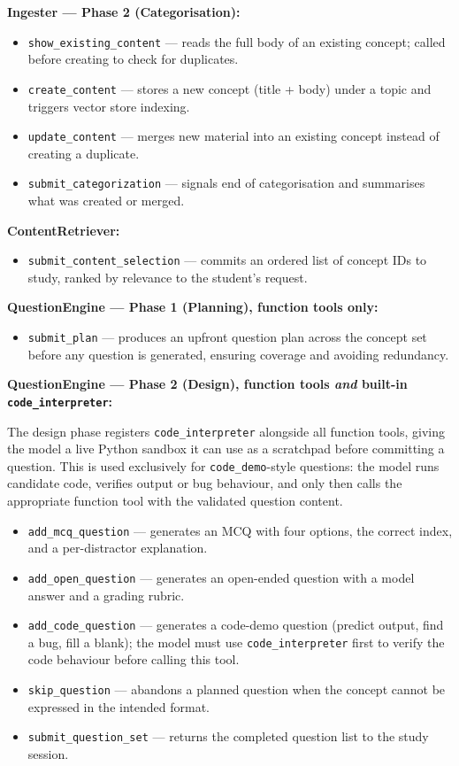 \documentclass[12pt,a4paper]{article}
\begin{document}
\textbf{Ingester --- Phase 2 (Categorisation):}
\begin{itemize}[leftmargin=*, itemsep=2pt]
  \item \texttt{show\_existing\_content} --- reads the full body of an existing concept; called before creating to check for duplicates.
  \item \texttt{create\_content} --- stores a new concept (title + body) under a topic and triggers vector store indexing.
  \item \texttt{update\_content} --- merges new material into an existing concept instead of creating a duplicate.
  \item \texttt{submit\_categorization} --- signals end of categorisation and summarises what was created or merged.
\end{itemize}

\textbf{ContentRetriever:}
\begin{itemize}[leftmargin=*, itemsep=2pt]
  \item \texttt{submit\_content\_selection} --- commits an ordered list of concept IDs to study, ranked by relevance to the student's request.
\end{itemize}

\textbf{QuestionEngine --- Phase 1 (Planning), function tools only:}
\begin{itemize}[leftmargin=*, itemsep=2pt]
  \item \texttt{submit\_plan} --- produces an upfront question plan across the concept set before any question is generated, ensuring coverage and avoiding redundancy.
\end{itemize}

\textbf{QuestionEngine --- Phase 2 (Design), function tools \textit{and} built-in \texttt{code\_interpreter}:}

The design phase registers \texttt{code\_interpreter} alongside all function tools, giving the model a live Python sandbox it can use as a scratchpad before committing a question. This is used exclusively for \texttt{code\_demo}-style questions: the model runs candidate code, verifies output or bug behaviour, and only then calls the appropriate function tool with the validated question content.
\begin{itemize}[leftmargin=*, itemsep=2pt]
  \item \texttt{add\_mcq\_question} --- generates an MCQ with four options, the correct index, and a per-distractor explanation.
  \item \texttt{add\_open\_question} --- generates an open-ended question with a model answer and a grading rubric.
  \item \texttt{add\_code\_question} --- generates a code-demo question (predict output, find a bug, fill a blank); the model must use \texttt{code\_interpreter} first to verify the code behaviour before calling this tool.
  \item \texttt{skip\_question} --- abandons a planned question when the concept cannot be expressed in the intended format.
  \item \texttt{submit\_question\_set} --- returns the completed question list to the study session.
\end{itemize}
\end{document}
